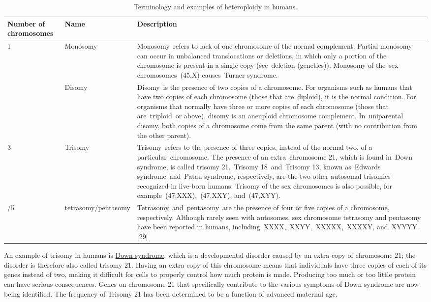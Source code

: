 \begin{longtable}[t]{>{\raggedright\arraybackslash}p{5em}>{\raggedright\arraybackslash}p{5em}>{\raggedright\arraybackslash}p{10em}}
\caption{\label{tab:heteroploidy}Terminology and examples of heteroploidy in humans.}\\
\toprule
Number of chromosomes & Name & Description\\
\midrule
\rowcolor{gray!6}  1 & Monosomy & Monosomy refers to lack of one chromosome of the normal complement. Partial monosomy can occur in unbalanced translocations or deletions, in which only a portion of the chromosome is present in a single copy (see deletion (genetics)). Monosomy of the sex chromosomes (45,X) causes Turner syndrome.\\
2 & Disomy & Disomy is the presence of two copies of a chromosome. For organisms such as humans that have two copies of each chromosome (those that are diploid), it is the normal condition. For organisms that normally have three or more copies of each chromosome (those that are triploid or above), disomy is an aneuploid chromosome complement. In uniparental disomy, both copies of a chromosome come from the same parent (with no contribution from the other parent).\\
\rowcolor{gray!6}  3 & Trisomy & Trisomy refers to the presence of three copies, instead of the normal two, of a particular chromosome. The presence of an extra chromosome 21, which is found in Down syndrome, is called trisomy 21. Trisomy 18 and Trisomy 13, known as Edwards syndrome and Patau syndrome, respectively, are the two other autosomal trisomies recognized in live-born humans. Trisomy of the sex chromosomes is also possible, for example (47,XXX), (47,XXY), and (47,XYY).\\
4/5 & tetrasomy/pentasomy & Tetrasomy and pentasomy are the presence of four or five copies of a chromosome, respectively. Although rarely seen with autosomes, sex chromosome tetrasomy and pentasomy have been reported in humans, including XXXX, XXYY, XXXXX, XXXXY, and XYYYY.[29]\\
\bottomrule
\end{longtable}

An example of trisomy in humans is \href{https://en.wikipedia.org/wiki/Down_syndrome}{Down syndrome}, which is a developmental disorder caused by an extra copy of chromosome 21; the disorder is therefore also called trisomy 21. Having an extra copy of this chromosome means that individuals have three copies of each of its genes instead of two, making it difficult for cells to properly control how much protein is made. Producing too much or too little protein can have serious consequences. Genes on chromosome 21 that specifically contribute to the various symptoms of Down syndrome are now being identified. The frequency of Trisomy 21 has been determined to be a function of advanced maternal age.



